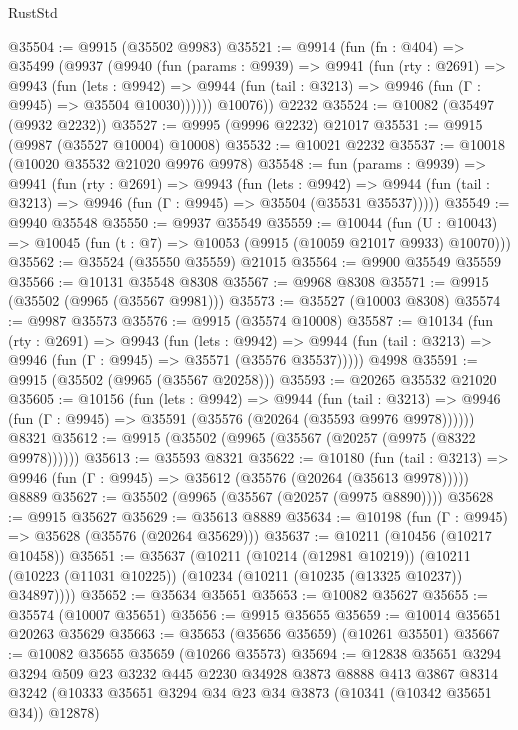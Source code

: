 \begin{lexlean}{RustStd}
\begin{coremodule}
{\begin{coremodule}
{{{{{{{{{{{{{{{{{{{{{{{{{@35504 := @9915 (@35502 @9983)
@35521 := @9914
    (fun (fn : @404) =>
    @35499
      (@9937
        (@9940
          (fun (params : @9939) =>
          @9941
            (fun (rty : @2691) =>
            @9943
              (fun (lets : @9942) =>
              @9944 (fun (tail : @3213) => @9946 (fun (Γ : @9945) => @35504 @10030))))))
        @10076))
    @2232
@35524 := @10082 (@35497 (@9932 @2232))
@35527 := @9995 (@9996 @2232) @21017
@35531 := @9915 (@9987 (@35527 @10004) @10008)
@35532 := @10021 @2232
@35537 := @10018 (@10020 @35532 @21020 @9976 @9978)
@35548 := fun (params : @9939) =>
  @9941
    (fun (rty : @2691) =>
    @9943
      (fun (lets : @9942) =>
      @9944 (fun (tail : @3213) => @9946 (fun (Γ : @9945) => @35504 (@35531 @35537)))))
@35549 := @9940 @35548
@35550 := @9937 @35549
@35559 := @10044
    (fun (U : @10043) => @10045 (fun (t : @7) => @10053 (@9915 (@10059 @21017 @9933) @10070)))
@35562 := @35524 (@35550 @35559) @21015
@35564 := @9900 @35549 @35559
@35566 := @10131 @35548 @8308
@35567 := @9968 @8308
@35571 := @9915 (@35502 (@9965 (@35567 @9981)))
@35573 := @35527 (@10003 @8308)
@35574 := @9987 @35573
@35576 := @9915 (@35574 @10008)
@35587 := @10134
    (fun (rty : @2691) =>
    @9943
      (fun (lets : @9942) =>
      @9944 (fun (tail : @3213) => @9946 (fun (Γ : @9945) => @35571 (@35576 @35537)))))
    @4998
@35591 := @9915 (@35502 (@9965 (@35567 @20258)))
@35593 := @20265 @35532 @21020
@35605 := @10156
    (fun (lets : @9942) =>
    @9944
      (fun (tail : @3213) =>
      @9946 (fun (Γ : @9945) => @35591 (@35576 (@20264 (@35593 @9976 @9978))))))
    @8321
@35612 := @9915 (@35502 (@9965 (@35567 (@20257 (@9975 (@8322 @9978))))))
@35613 := @35593 @8321
@35622 := @10180
    (fun (tail : @3213) => @9946 (fun (Γ : @9945) => @35612 (@35576 (@20264 (@35613 @9978)))))
    @8889
@35627 := @35502 (@9965 (@35567 (@20257 (@9975 @8890))))
@35628 := @9915 @35627
@35629 := @35613 @8889
@35634 := @10198 (fun (Γ : @9945) => @35628 (@35576 (@20264 @35629)))
@35637 := @10211 (@10456 (@10217 @10458))
@35651 := @35637
    (@10211
      (@10214 (@12981 @10219))
      (@10211 (@10223 (@11031 @10225)) (@10234 (@10211 (@10235 (@13325 @10237)) @34897))))
@35652 := @35634 @35651
@35653 := @10082 @35627
@35655 := @35574 (@10007 @35651)
@35656 := @9915 @35655
@35659 := @10014 @35651 @20263 @35629
@35663 := @35653 (@35656 @35659) (@10261 @35501)
@35667 := @10082 @35655 @35659 (@10266 @35573)
@35694 := @12838
    @35651
    @3294
    @3294
    @509
    @23
    @3232
    @445
    @2230
    @34928
    @3873
    @8888
    @413
    @3867
    @8314
    @3242
    (@10333 @35651 @3294 @34 @23 @34 @3873 (@10341 (@10342 @35651 @34)) @12878)
}}}}}}}}}}}}}}}}}}}}}}}}}
\end{coremodule}}
\end{coremodule}
\end{lexlean}
